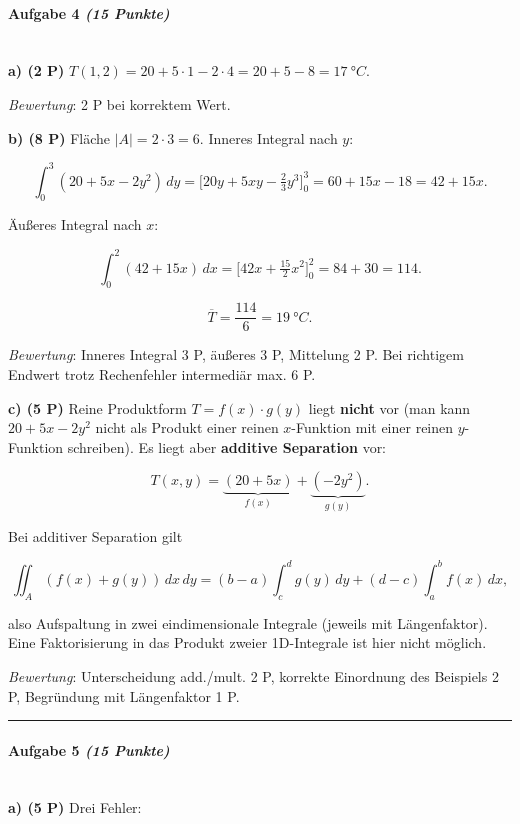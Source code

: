 \documentclass[11pt, a4paper]{article}
\begin{document}
\paragraph{Aufgabe 4 \textit{(15 Punkte)}}\mbox{}\\[2pt]

\textbf{a) (2 P)} $T(1,2) = 20+5\cdot 1-2\cdot 4 = 20+5-8 = 17\ °C$.

\textit{Bewertung}: 2 P bei korrektem Wert.


\textbf{b) (8 P)} Fläche $|A|=2\cdot 3 = 6$. Inneres Integral nach $y$:

\[
\int_0^3 (20+5x-2y^2)\,dy = \big[20y+5xy-\tfrac{2}{3}y^3\big]_0^3 = 60+15x-18 = 42+15x.
\]

Äußeres Integral nach $x$:

\[
\int_0^2 (42+15x)\,dx = \big[42x+\tfrac{15}{2}x^2\big]_0^2 = 84+30 = 114.
\]

\[
\overline{T} = \frac{114}{6} = 19\ °C.
\]

\textit{Bewertung}: Inneres Integral 3 P, äußeres 3 P, Mittelung 2 P. Bei richtigem Endwert trotz Rechenfehler intermediär max. 6 P.


\textbf{c) (5 P)} Reine Produktform $T = f(x)\cdot g(y)$ liegt \textbf{nicht} vor (man kann $20+5x-2y^2$ nicht als Produkt einer reinen $x$-Funktion mit einer reinen $y$-Funktion schreiben). Es liegt aber \textbf{additive Separation} vor:

\[
T(x,y) = \underbrace{(20+5x)}_{f(x)} + \underbrace{(-2y^2)}_{g(y)}.
\]

Bei additiver Separation gilt

\[
\iint_A (f(x)+g(y))\,dx\,dy = (b{-}a)\!\int_c^d g(y)\,dy + (d{-}c)\!\int_a^b f(x)\,dx,
\]

also Aufspaltung in zwei eindimensionale Integrale (jeweils mit Längenfaktor). Eine Faktorisierung in das Produkt zweier 1D-Integrale ist hier nicht möglich.

\textit{Bewertung}: Unterscheidung add./mult. 2 P, korrekte Einordnung des Beispiels 2 P, Begründung mit Längenfaktor 1 P.



\noindent\textcolor{rulegray}{\rule{\linewidth}{0.4pt}}


\paragraph{Aufgabe 5 \textit{(15 Punkte)}}\mbox{}\\[2pt]

\textbf{a) (5 P)} Drei Fehler:
\end{document}
